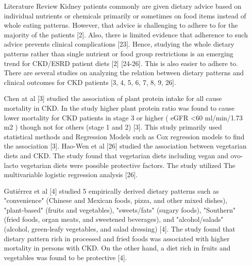 Literature Review Kidney patients commonly are given dietary advice based on individual nutrients or chemicals primarily or sometimes on food items instead of whole eating patterns. However, that advice is challenging to adhere to for the majority of the patients [2].
Also, there is limited evidence that adherence to such advice prevents clinical complications [23]. Hence, studying the whole dietary patterns rather than single nutrient or food group restrictions is an emerging trend for CKD/ESRD patient diets [2] [24-26]. This is also easier to adhere to. There are several studies on analyzing the relation between dietary patterns and clinical outcomes for CKD patients [3, 4, 5, 6, 7, 8, 9, 26].

Chen at al [3] studied the association of plant protein intake for all cause mortality in CKD. In the study higher plant protein ratio was found to cause lower mortality for CKD patients in stage 3 or higher ( eGFR  \textless 60 ml/min/1.73 m2 ) though not for others (stage 1
and 2) [3]. This study primarily used statistical methods and Regression Models such as Cox regression models to find the association [3]. Hao-Wen et al [26] studied the association between vegetarian diets and CKD. The study found that vegetarian diets including vegan and
ovo-lacto vegetarian diets were possible protective factors. The study utilized The multivariable logistic regression analysis [26].

Gutiérrez et al [4] studied 5 empirically derived dietary patterns such as "convenience" (Chinese and Mexican foods, pizza, and other mixed dishes), "plant-based" (fruits and vegetables), "sweets/fats" (sugary foods), "Southern" (fried foods, organ meats, and sweetened
beverages), and "alcohol/salads" (alcohol, green-leafy vegetables, and salad dressing) [4]. The study found that dietary pattern rich in processed and fried foods was associated with higher mortality in persons with CKD. On the other hand, a diet rich in fruits and
vegetables was found to be protective [4].

